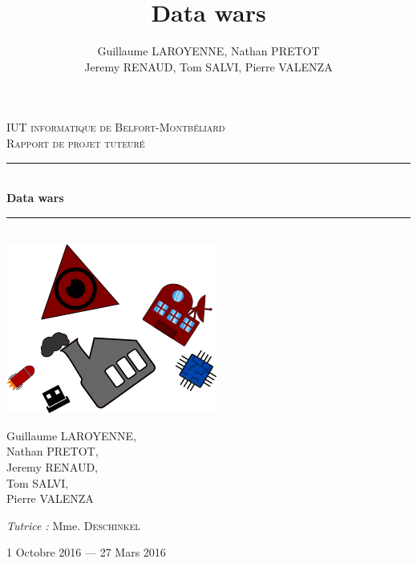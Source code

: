 \documentclass[a4paper, titlepage]{livret}
\title{Data wars }
\author{Guillaume LAROYENNE, Nathan PRETOT \\ Jeremy RENAUD, Tom SALVI, Pierre VALENZA}
\newcommand{\HRule}{\rule{\linewidth}{0.5mm}}
\begin{document}
\begin{titlepage}
  \begin{sffamily}
  \begin{center}


    \textsc{\LARGE IUT informatique de Belfort-Montbéliard}\\[2cm]

    \textsc{\Large Rapport de projet tuteuré}\\[1.5cm]

    \HRule \\[0.4cm]
    { \huge \bfseries Data wars\\[0.4cm] }

    \HRule \\[2cm]
    \includegraphics[scale=0.4]{../mainPageimg.png}
    \\[2cm]

    \begin{minipage}{0.4\textwidth}
      \begin{flushleft} \large
        Guillaume \textsc{LAROYENNE}, \\ Nathan \textsc{PRETOT}, \\ Jeremy \textsc{RENAUD}, \\ Tom \textsc{SALVI}, \\ Pierre \textsc{VALENZA}
      \end{flushleft}
    \end{minipage}
    \begin{minipage}{0.4\textwidth}
      \begin{flushright} \large
        \emph{Tutrice :} Mme. \textsc{Deschinkel} \\
      \end{flushright}
    \end{minipage}

    \vfill

    {\large 1\ier{} Octobre 2016 — 27 Mars 2016}

  \end{center}
  \end{sffamily}
\end{titlepage}
\end{document}
